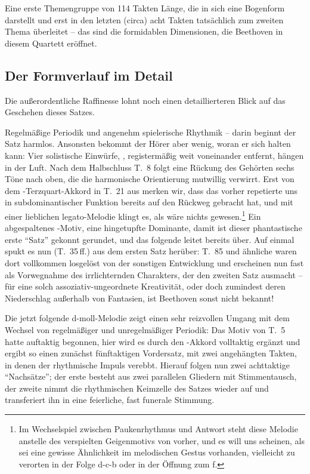 Eine erste Themengruppe von 114 Takten Länge, die in sich eine
Bogenform darstellt und erst in den letzten (circa) acht Takten
tatsächlich zum zweiten Thema überleitet – das sind die
formidablen Dimensionen, die Beethoven in diesem Quartett eröffnet.

\subsection{Der Formverlauf im Detail}
Die außerordentliche Raffinesse lohnt noch einen detaillierteren
Blick auf das Geschehen dieses Satzes.

Regelmäßige Periodik und angenehm spielerische Rhythmik – darin
beginnt der Satz harmlos.  Ansonsten bekommt der Hörer aber wenig,
woran er sich halten kann: Vier solistische Einwürfe, ,
registermäßig weit voneinander entfernt, hängen in der Luft.  Nach
dem Halbschluss T.~8 folgt eine Rückung des Gehörten sechs Töne nach
oben, die die harmonische Orientierung mutwillig verwirrt.  Erst
von dem -Terzquart-Akkord in T.~21 aus merken wir, dass das
vorher repetierte  uns in subdominantischer Funktion
bereits auf den Rückweg gebracht hat, und mit einer lieblichen
legato-Melodie klingt es, als wäre nichts gewesen.\footnote{Im
Wechselspiel zwischen Paukenrhythmus und Antwort steht diese Melodie
anstelle des verspielten Geigenmotivs von vorher, und es will uns
scheinen, als sei eine gewisse Ähnlichkeit im melodischen Gestus
vorhanden, vielleicht zu verorten in der Folge \mbox{d-c-b} oder in der
Öffnung zum f.} Ein abgespaltenes -Motiv, eine
 hingetupfte Dominante, damit ist dieser
phantastische erste \enquote{Satz} gekonnt gerundet, und das folgende
 leitet bereits über.  Auf einmal spukt es nun (T.~35\,ff.)
aus dem ersten Satz herüber: T.~85 und ähnliche waren dort vollkommen
losgelöst von der sonstigen Entwicklung und erscheinen nun
fast als Vorwegnahme des irrlichternden Charakters, der den
zweiten Satz ausmacht – für eine solch assoziativ-ungeordnete
Kreativität, oder doch zumindest deren Niederschlag außerhalb von
Fantasien, ist Beethoven sonst nicht bekannt!

Die jetzt folgende d-moll-Melodie zeigt einen sehr reizvollen
Umgang mit dem Wechsel von regelmäßiger und unregelmäßiger Periodik:
Das Motiv von T.~5 hatte auftaktig begonnen, hier wird es durch den
-Akkord volltaktig ergänzt und ergibt so einen
zunächst fünftaktigen Vordersatz, mit zwei angehängten Takten, in denen
der rhythmische Impuls verebbt.  Hierauf folgen nun zwei achttaktige
\enquote{Nachsätze}; der erste besteht aus zwei parallelen Gliedern mit
Stimmentausch, der zweite nimmt die rhythmischen Keimzelle des Satzes
wieder auf und transferiert ihn in eine feierliche, fast funerale Stimmung.

